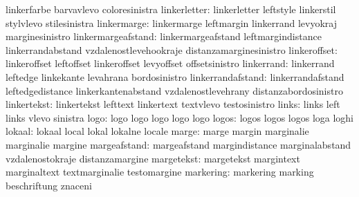                            linkerfarbe               barvavlevo
                           coloresinistra
             linkerletter: linkerletter              leftstyle
                           linkerstil                stylvlevo
                           stilesinistra
              linkermarge: linkermarge               leftmargin
                           linkerrand                levyokraj
                           marginesinistro
       linkermargeafstand: linkermargeafstand        leftmargindistance
                           linkerrandabstand         vzdalenostlevehookraje
                           distanzamarginesinistro
             linkeroffset: linkeroffset              leftoffset
                           linkeroffset              levyoffset
                           offsetsinistro            %
               linkerrand: linkerrand                leftedge
                           linkekante                levahrana
                           bordosinistro
        linkerrandafstand: linkerrandafstand         leftedgedistance
                           linkerkantenabstand       vzdalenostlevehrany
                           distanzabordosinistro
              linkertekst: linkertekst               lefttext
                           linkertext                textvlevo
                           testosinistro             %
                    links: links                     left
                           links                     vlevo
                           sinistra
                     logo: logo                      logo
                           logo                      logo
                           logo
                    logos: logos                     logos
                           logos                     loga
                           loghi
                   lokaal: lokaal                    local
                           lokal                     lokalne
                           locale
                    marge: marge                     margin
                           marginalie                marginalie
                           margine
             margeafstand: margeafstand              margindistance
                           marginalabstand           vzdalenostokraje
                           distanzamargine
               margetekst: margetekst                margintext
                           marginaltext              textmarginalie
                           testomargine
                markering: markering                 marking
                           beschriftung              znaceni
